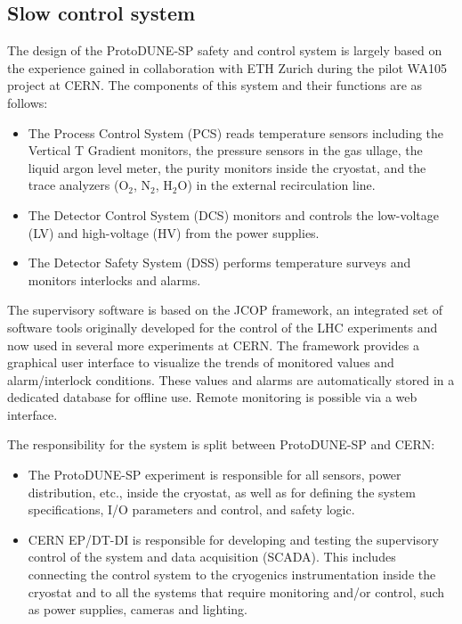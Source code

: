 \subsection{Slow control system}
\label{sec:slowcontrol}

The design of the ProtoDUNE-SP safety and control system is largely based on the experience gained in collaboration with ETH Zurich during the pilot WA105 project at CERN. The components of this system and their functions are as follows:
\begin{itemize}
\item	The Process Control System (PCS) reads temperature sensors including the Vertical T Gradient monitors, 
the pressure sensors in the gas ullage, the liquid argon level meter,
the purity monitors inside the cryostat, and the trace analyzers (O$_2$, N$_2$, H$_2$O) in the external recirculation line.
\item	The Detector Control System (DCS) monitors and controls the low-voltage (LV) and high-voltage (HV) from the power supplies.
\item	The Detector Safety System (DSS) performs temperature surveys and monitors interlocks and alarms.
\end{itemize}

The supervisory software is based on the JCOP framework, an integrated set of software tools originally developed for the control of the LHC experiments and 
now used in several more experiments at CERN. The framework provides a graphical user interface to visualize the trends of monitored values and 
alarm/interlock conditions. These values and alarms are automatically stored in a dedicated database for offline use. Remote monitoring is possible via a web 
interface.

The responsibility for the system is split between ProtoDUNE-SP and CERN: 
\begin{itemize}
\item The ProtoDUNE-SP experiment is responsible for all sensors, power distribution, etc., inside the cryostat, 
as well as for defining the system specifications, I/O parameters and control, and safety logic. 
\item CERN EP/DT-DI  is responsible for developing and testing the supervisory control of the system and data acquisition (SCADA).
This includes connecting the control system to the cryogenics instrumentation inside the cryostat and to all the systems that require monitoring and/or control, such as power supplies, cameras and lighting. 
\end{itemize}

